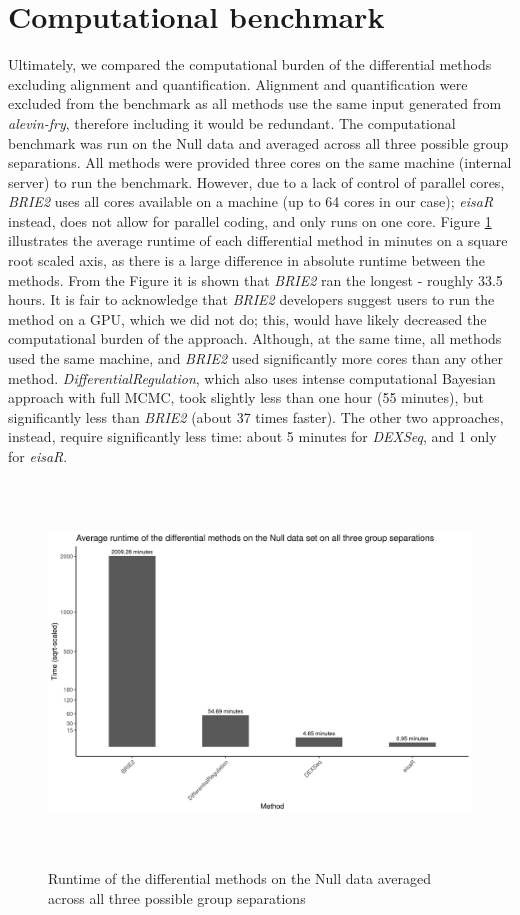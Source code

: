 \section{Computational benchmark}
Ultimately, we compared the computational burden of the differential methods excluding alignment and quantification. Alignment and quantification were excluded from the benchmark as all methods use the same input generated from \emph{alevin-fry}, therefore including it would be redundant. The computational benchmark was run on the Null data and averaged across all three possible group separations. All methods were provided three cores on the same machine (internal server) to run the benchmark. However, due to a lack of control of parallel cores, \emph{BRIE2} uses all cores available on a machine (up to 64 cores in our case); \emph{eisaR} instead, does not allow for parallel coding, and only runs on one core. Figure \ref{fig:bench_mark} illustrates the average runtime of each differential method in minutes on a square root scaled axis, as there is a large difference in absolute runtime between the methods. From the Figure it is shown that \emph{BRIE2} ran the longest - roughly 33.5 hours. It is fair to acknowledge that \emph{BRIE2} developers suggest users to run the method on a GPU, which we did not do; this, would have likely decreased the computational burden of the approach. Although, at the same time, all methods used the same machine, and \emph{BRIE2} used significantly more cores than any other method.
\emph{DifferentialRegulation}, which also uses intense computational Bayesian approach with full MCMC, took slightly less than one hour (55 minutes), but significantly less than \emph{BRIE2} (about 37 times faster). The other two approaches, instead, require significantly less time: about 5 minutes for \emph{DEXSeq}, and 1 only for \emph{eisaR}.

\begin{figure}[!htb]
\begin{center}
\includegraphics[width=6in,height=4in]{../figures/null_analysis/bench_mark.png}
\end{center}
\caption{Runtime of the differential methods on the Null data averaged across all three possible group separations}
\label{fig:bench_mark}
\end{figure}
\FloatBarrier

